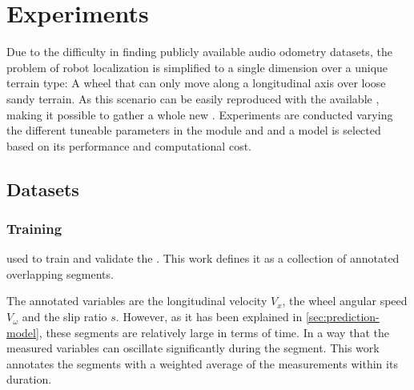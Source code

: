 \section{Experiments} \label{sec:experiments}

Due to the difficulty in finding publicly available audio odometry datasets,
the problem of robot localization is simplified to a single dimension over a
unique terrain type: A wheel that can only move along a longitudinal axis over
loose sandy terrain. As this scenario can be easily reproduced with the
available , making it possible
to gather a whole new . Experiments are conducted
varying the different tuneable parameters in the
 module and 
and a model is selected based on its performance and computational cost.



\subsection{Datasets} \label{subsec:datasets}

\subsubsection{Training}
used to train and validate the . This work
defines it as a collection of annotated overlapping segments.

The annotated variables are the longitudinal velocity $V_x$, the wheel angular
speed $V_\omega$ and the slip ratio $s$. However, as it has been explained in
\cref{sec:prediction-model}, these segments are relatively large in terms of
time. In a way that the measured variables can oscillate significantly during
the segment. This work annotates the segments with a weighted average of the
measurements within its duration.




